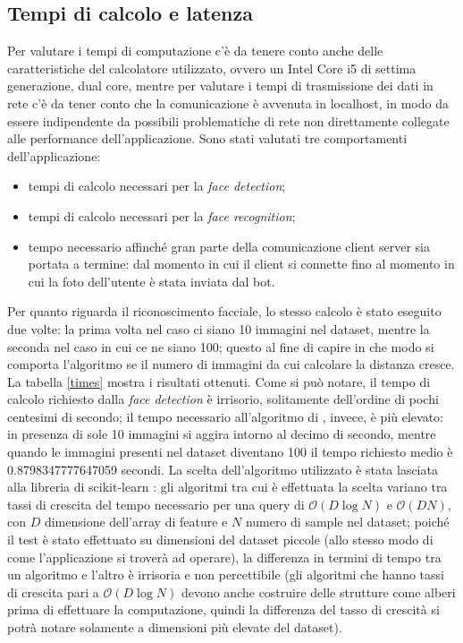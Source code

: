 \subsection{Tempi di calcolo e latenza}

Per valutare i tempi di computazione c'è da tenere conto anche delle caratteristiche del calcolatore utilizzato, ovvero un Intel Core i5 di settima generazione, dual core, mentre per valutare i tempi di trasmissione dei dati in rete c'è da tener conto che la comunicazione è avvenuta in localhost, in modo da essere indipendente da possibili problematiche di rete non direttamente collegate alle performance dell'applicazione. 
Sono stati valutati tre comportamenti dell'applicazione:
\begin{itemize}
	\item tempi di calcolo necessari per la \textit{face detection};
	\item tempi di calcolo necessari per la \textit{face recognition};
	\item tempo necessario affinché gran parte della comunicazione client server sia portata a termine: dal momento in cui il client si connette fino al momento in cui la foto dell'utente è stata inviata dal bot.
\end{itemize}
Per quanto riguarda il riconoscimento facciale, lo stesso calcolo è stato eseguito due volte: la prima volta nel caso ci siano 10 immagini nel dataset, mentre la seconda nel caso in cui ce ne siano 100; questo al fine di capire in che modo si comporta l'algoritmo se il numero di immagini da cui calcolare la distanza cresce. La tabella \ref{times} mostra i risultati ottenuti.
Come si può notare, il tempo di calcolo richiesto dalla \textit{face detection} è irrisorio, solitamente dell'ordine di pochi centesimi di secondo; il tempo necessario all'algoritmo di , invece, è più elevato: in presenza di sole 10 immagini si aggira intorno al decimo di secondo, mentre quando le immagini presenti nel dataset diventano 100 il tempo richiesto medio è 0.8798347777647059 secondi. La scelta dell'algoritmo utilizzato è stata lasciata alla libreria di scikit-learn \cite{scikit-learn}: gli algoritmi tra cui è effettuata la scelta variano tra tassi di crescita del tempo necessario per una query di $\mathcal{O}(D\log{N})$ e $\mathcal{O}(DN)$, con $D$ dimensione dell'array di feature e $N$ numero di sample nel dataset; poiché il test è stato effettuato su dimensioni del dataset piccole (allo stesso modo di come l'applicazione si troverà ad operare), la differenza in termini di tempo tra un algoritmo e l'altro è irrisoria e non percettibile (gli algoritmi che hanno tassi di crescita pari a $\mathcal{O}(D\log{N})$ devono anche costruire delle strutture come alberi prima di effettuare la computazione, quindi la differenza del tasso di crescità si potrà notare solamente a dimensioni più elevate del dataset).

